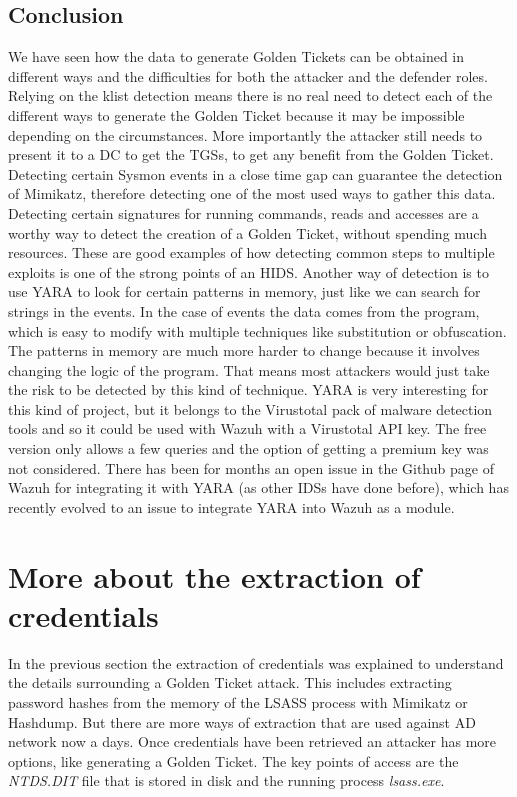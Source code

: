 \subsection{Conclusion}
We have seen how the data to generate Golden Tickets can be obtained in different ways and the difficulties for both the attacker and the defender roles.
\linej
\linej
Relying on the klist detection means there is no real need to detect each of the different ways to generate the Golden Ticket because it may be impossible depending on the circumstances. More importantly the attacker still needs to present it to a DC to get the TGSs, to get any benefit from the Golden Ticket.
\linej
Detecting certain Sysmon events in a close time gap can guarantee the detection of Mimikatz, therefore detecting one of the most used ways to gather this data. Detecting certain signatures for running commands, reads and accesses are a worthy way to detect the creation of a Golden Ticket, without spending much resources.
\linej
These are good examples of how detecting common steps to multiple exploits is one of the strong points of an HIDS.
\linej
\linej
Another way of detection is to use YARA to look for certain patterns in memory, just like we can search for strings in the events. In the case of events the data comes from the program, which is easy to modify with multiple techniques like substitution or obfuscation. The patterns in memory are much more harder to change because it involves changing the logic of the program. That means most attackers would just take the risk to be detected by this kind of technique.
\linej
YARA is very interesting for this kind of project, but it belongs to the Virustotal pack of malware detection tools and so it could be used with Wazuh with a Virustotal API key. The free version only allows a few queries and the option of getting a premium key was not considered. There has been for months an open issue in the Github page of Wazuh for integrating it with YARA (as other IDSs have done before), which has recently evolved to an issue to integrate YARA into Wazuh as a module\cite{yara_module}.


\section{More about the extraction of credentials}
In the previous section the extraction of credentials was explained to understand the details surrounding a Golden Ticket attack. This includes extracting password hashes from the memory of the LSASS process with Mimikatz or Hashdump. But there are more ways of extraction that are used against AD network now a days.
\linej
Once credentials have been retrieved an attacker has more options, like generating a Golden Ticket.
The key points of access are the \textit{NTDS.DIT} file that is stored in disk and the running process \textit{lsass.exe}.

